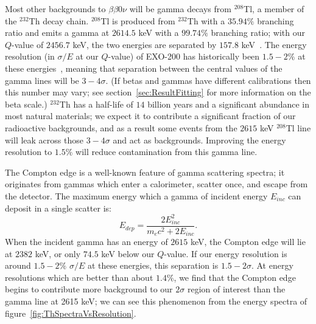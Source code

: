 Most other backgrounds to $\beta\beta 0\nu$ will be gamma decays from $^{208}$Tl, a member of the $^{232}$Th decay chain.  $^{208}$Tl is produced from $^{232}$Th with a $35.94\%$ branching ratio and emits a gamma at $2614.5$ keV with a $99.74\%$ branching ratio; with our $Q$-value of $2456.7$ keV, the two energies are separated by $157.8$ keV~\cite{ENSDF}.  The energy resolution (in $\sigma/E$ at our $Q$-value) of EXO-200 has historically been $1.5-2\%$ at these energies~\cite{NewEXObb0nPaper_2014}, meaning that separation between the central values of the gamma lines will be $3-4\sigma$.  (If betas and gammas have different calibrations then this number may vary; see section~\ref{sec:ResultFitting} for more information on the beta scale.)  $^{232}$Th has a half-life of $14$ billion years and a significant abundance in most natural materials; we expect it to contribute a significant fraction of our radioactive backgrounds, and as a result some events from the $2615$ keV $^{208}$Tl line will leak across those $3-4\sigma$ and act as backgrounds.  Improving the energy resolution to $1.5\%$ will reduce contamination from this gamma line.

The Compton edge is a well-known feature of gamma scattering spectra; it originates from gammas which enter a calorimeter, scatter once, and escape from the detector.  The maximum energy which a gamma of incident energy $E_{inc}$ can deposit in a single scatter is:~\cite{Compton}
\begin{equation}
E_{dep} = \frac{2E_{inc}^2}{m_e c^2 + 2E_{inc}}.
\end{equation}
When the incident gamma has an energy of $2615$ keV, the Compton edge will lie at $2382$ keV, or only $74.5$ keV below our $Q$-value.  If our energy resolution is around $1.5-2\%$ $\sigma/E$ at these energies, this separation is $1.5-2\sigma$.  At energy resolutions which are better than about $1.4\%$, we find that the Compton edge begins to contribute more background to our $2\sigma$ region of interest than the gamma line at 2615 keV; we can see this phenomenon from the energy spectra of figure~\ref{fig:ThSpectraVsResolution}.

